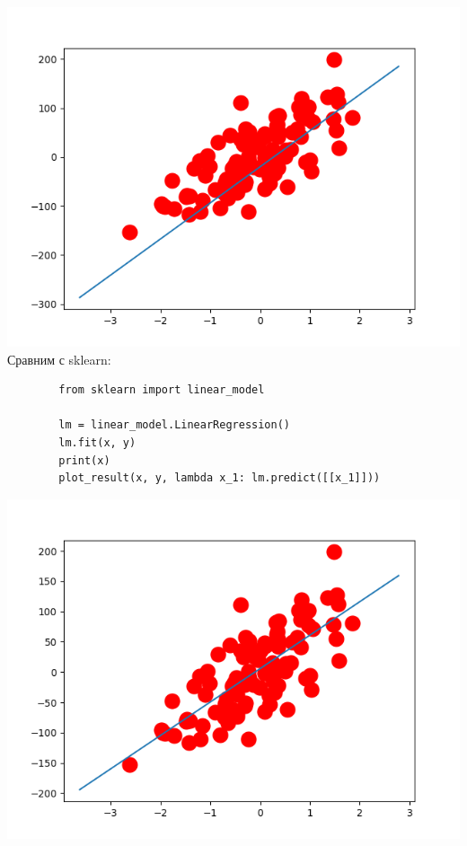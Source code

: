 \documentclass[12pt]{article} %
\begin{document}
 	\includegraphics{7}
 	Сравним с sklearn:
 	\begin{verbatim}
 		from sklearn import linear_model
 		
 		lm = linear_model.LinearRegression()
 		lm.fit(x, y)
 		print(x)
 		plot_result(x, y, lambda x_1: lm.predict([[x_1]]))
 	\end{verbatim}
 	\includegraphics{8}
 		
 		
 
\end{document}
